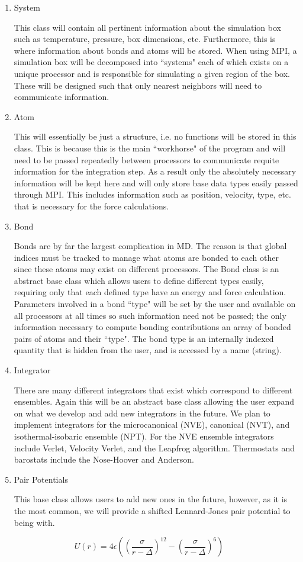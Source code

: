 \documentclass[10pt]{article}
\begin{document}
\begin{enumerate}
	\item{System} \par This class will contain all pertinent information about the simulation box such as temperature, pressure, box dimensions, etc.  Furthermore, this is where information about bonds and atoms will be stored.  When using MPI, a simulation box will be decomposed into ``systems" each of which exists on a unique processor and is responsible for simulating a given region of the box.  These will be designed such that only nearest neighbors will need to communicate information.
	\item{Atom} \par This will essentially be just a structure, i.e. no functions will be stored in this class.  This is because this is the main ``workhorse" of the program and will need to be passed repeatedly between processors to communicate requite information for the integration step.  As a result only the absolutely necessary information will be kept here and will only store base data types easily passed through MPI.  This includes information such as position, velocity, type, etc. that is necessary for the force calculations.
	\item{Bond} \par Bonds are by far the largest complication in MD.  The reason is that global indices must be tracked to manage what atoms are bonded to each other since these atoms may exist on different processors.  The Bond class is an abstract base class which allows users to define different types easily, requiring only that each defined type have an energy and force calculation.  Parameters involved in a bond ``type" will be set by the user and available on all processors at all times so such information need not be passed; the only information necessary to compute bonding contributions an array of bonded pairs of atoms and their ``type".  The bond type is an internally indexed quantity that is hidden from the user, and is accessed by a name (string).
	\item{Integrator} \par There are many different integrators that exist which correspond to different ensembles.  Again this will be an abstract base class allowing the user expand on what we develop and add new integrators in the future.  We plan to implement integrators for the microcanonical  (NVE), canonical (NVT), and isothermal-isobaric ensemble (NPT).  For the NVE ensemble integrators include Verlet, Velocity Verlet, and the Leapfrog algorithm.  Thermostats and barostats include the Nose-Hoover and Anderson.
	\item{Pair Potentials} \par This base class allows users to add new ones in the future, however, as it is the most common, we will provide a shifted Lennard-Jones pair potential to being with.
\end{enumerate}
\begin{equation}
	U(r) = 4\epsilon \left( \left( \frac{\sigma}{r-\Delta} \right)^{12} - \left( \frac{\sigma}{r - \Delta} \right)^{6} \right)
\end{equation}
\end{document}
